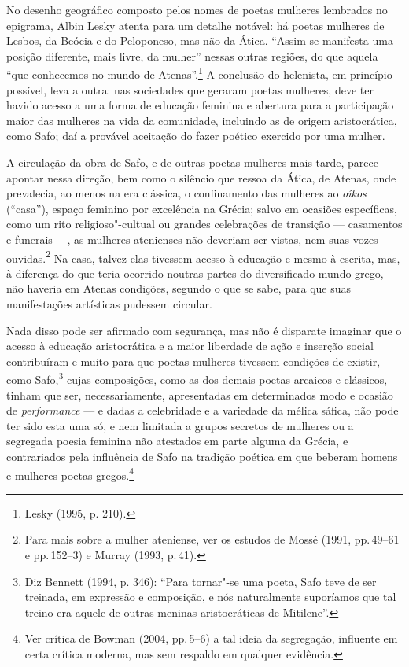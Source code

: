 No desenho geográfico composto pelos nomes de poetas mulheres
lembrados no epigrama, Albin Lesky atenta para um detalhe
notável: há poetas mulheres de Lesbos, da Beócia e do Peloponeso, mas não da
Ática. “Assim se manifesta uma posição diferente, mais livre, da mulher”
nessas outras regiões, do que aquela “que conhecemos no mundo de Atenas”.\footnote{ Lesky (1995, p. 210).} A
conclusão do helenista, em princípio possível, leva a outra: nas sociedades
que geraram poetas mulheres, deve ter havido acesso a uma forma de educação
feminina e abertura para a participação maior das mulheres na vida da
comunidade, incluindo as de origem aristocrática, como Safo; daí a provável
aceitação do fazer poético exercido por uma mulher.

A circulação da obra de Safo, e de outras poetas mulheres mais tarde, parece
apontar nessa direção, bem como o silêncio que ressoa da Ática, de Atenas, onde
prevalecia, ao menos na era clássica, o confinamento das mulheres ao \textit{oîkos} (“casa”), espaço
feminino por excelência na Grécia; salvo em ocasiões específicas, como um rito
religioso"-cultual ou grandes celebrações de transição --- casamentos e funerais ---, as mulheres atenienses não deveriam ser vistas, nem suas
vozes ouvidas.\footnote{ Para mais sobre a mulher ateniense, ver os estudos de
Mossé (1991, pp.\,49--61 e pp.\,152--3) e Murray (1993, p.\,41).} Na casa, talvez elas
tivessem acesso à educação e mesmo à escrita, mas, à diferença do que teria
ocorrido noutras partes do diversificado mundo grego, não haveria em Atenas
condições, segundo o que se sabe, para que suas manifestações artísticas
pudessem circular.

Nada disso pode ser afirmado com segurança, mas não é disparate imaginar que o acesso
à educação aristocrática e a maior liberdade de ação e inserção social
contribuíram e muito para que poetas mulheres tivessem condições de existir,
como Safo,\footnote{ Diz Bennett (1994, p. 346):
“Para tornar"-se uma poeta, Safo teve de ser treinada, em expressão
e composição, e nós naturalmente suporíamos que tal treino era aquele de outras
meninas aristocráticas de Mitilene”.} cujas composições, como as dos demais
poetas arcaicos e clássicos, tinham que ser, necessariamente, apresentadas em
determinados modo e ocasião de \textit{performance} --- e dadas a celebridade e a variedade da mélica sáfica, não pode ter sido esta uma só, e nem limitada
a grupos secretos de mulheres ou a segregada poesia feminina não atestados em parte alguma da Grécia, e contrariados pela influência de Safo na tradição poética em que beberam homens e mulheres poetas gregos.\footnote{Ver crítica de Bowman (2004, pp.\,5--6) a tal ideia da segregação, influente em certa crítica moderna, mas sem respaldo em qualquer evidência.}

